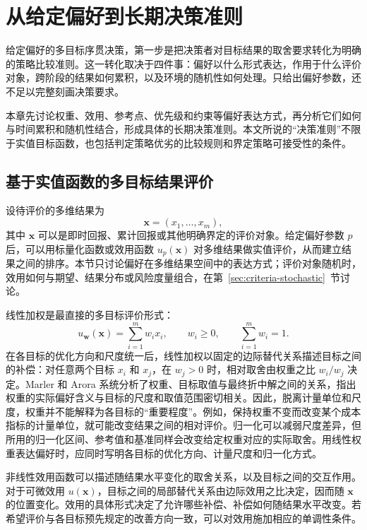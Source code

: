 \section{从给定偏好到长期决策准则}\label{sec:criteria}

给定偏好的多目标序贯决策，第一步是把决策者对目标结果的取舍要求转化为明确的策略比较准则。这一转化取决于四件事：偏好以什么形式表达，作用于什么评价对象，跨阶段的结果如何累积，以及环境的随机性如何处理。只给出偏好参数，还不足以完整刻画决策要求。

本章先讨论权重、效用、参考点、优先级和约束等偏好表达方式，再分析它们如何与时间累积和随机性结合，形成具体的长期决策准则。本文所说的“决策准则”不限于实值目标函数，也包括判定策略优劣的比较规则和界定策略可接受性的条件。

\subsection{基于实值函数的多目标结果评价}\label{sec:criteria-value}

设待评价的多维结果为
\begin{equation}
\mathbf{x}=\left(x_{1},\ldots,x_{m}\right),
\end{equation}
其中 $\mathbf{x}$ 可以是即时回报、累计回报或其他明确界定的评价对象。给定偏好参数 $p$ 后，可以用标量化函数或效用函数 $u_{p}(\mathbf{x})$ 对多维结果做实值评价，从而建立结果之间的排序\cite{wang2017,hayes2022}。本节只讨论偏好在多维结果空间中的表达方式；评价对象随机时，效用如何与期望、结果分布或风险度量组合，在第~\ref{sec:criteria-stochastic}~节讨论。

线性加权是最直接的多目标评价形式：
\begin{equation}
u_{\mathbf{w}}(\mathbf{x})
=
\sum_{i=1}^{m}w_{i}x_{i},
\qquad
w_{i}\geq 0,
\qquad
\sum_{i=1}^{m}w_{i}=1.
\end{equation}
在各目标的优化方向和尺度统一后，线性加权以固定的边际替代关系描述目标之间的补偿：对任意两个目标 $x_i$ 和 $x_j$，在 $w_j>0$ 时，相对取舍由权重之比 $w_i/w_j$ 决定。Marler 和 Arora 系统分析了权重、目标取值与最终折中解之间的关系，指出权重的实际偏好含义与目标的尺度和取值范围密切相关\cite{marler2010}。因此，脱离计量单位和尺度，权重并不能解释为各目标的“重要程度”。例如，保持权重不变而改变某个成本指标的计量单位，就可能改变结果之间的相对评价。归一化可以减弱尺度差异，但所用的归一化区间、参考值和基准同样会改变给定权重对应的实际取舍。用线性权重表达偏好时，应同时写明各目标的优化方向、计量尺度和归一化方式\cite{hayes2022}。

非线性效用函数可以描述随结果水平变化的取舍关系，以及目标之间的交互作用。对于可微效用 $u(\mathbf{x})$，目标之间的局部替代关系由边际效用之比决定，因而随 $\mathbf{x}$ 的位置变化。效用的具体形式决定了允许哪些补偿、补偿如何随结果水平改变。若希望评价与各目标预先规定的改善方向一致，可以对效用施加相应的单调性条件。

